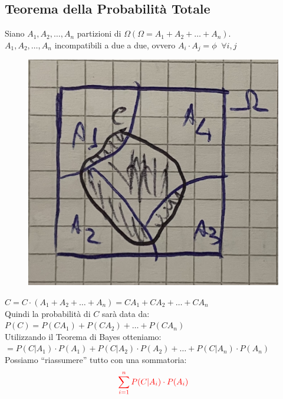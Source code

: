 \documentclass{article}
\begin{document}
\subsection{Teorema della Probabilità Totale}
Siano $A_1,A_2, \dots, A_n$ partizioni di $\Omega \left( \Omega = A_1 + A_2 + \dots + A_n \right)$. \\
$A_1,A_2, \dots, A_n$ incompatibili a due a due, ovvero $A_i \cdot A_j = \phi \;\; \forall i,j$ \\
\begin{figure}[ht]
\centering
\includegraphics[scale=0.11]{images/24.ProbTot.jpeg}
\end{figure}
$C = C \cdot (A_1 + A_2 + \dots + A_n) = CA_1 +CA_2 + \dots + CA_n$ \\
Quindi la probabilità di $C$ sarà data da: \\
$P(C) = P(CA_1) + P(CA_2) + \dots + P(CA_n)$ \\
Utilizzando il Teorema di Bayes otteniamo: \\
$= P(C|A_1) \cdot P(A_1) + P(C|A_2) \cdot P(A_2) + \dots + P(C|A_n) \cdot P(A_n)$ \\
Possiamo “riassumere” tutto con una sommatoria: 
\[\color{red} \sum_{i=1}^{n} P(C|A_i) \cdot P(A_i)\]
\newpage
\end{document}
